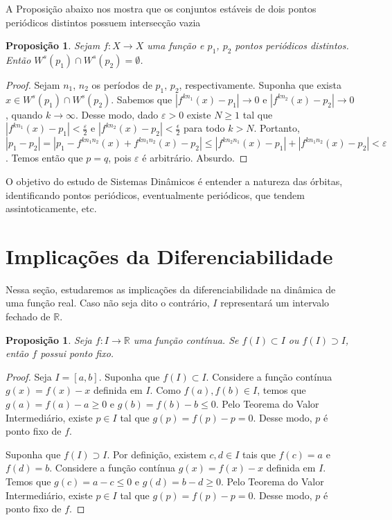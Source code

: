 \documentclass[a4paper, 12pt]{article}
\theoremstyle{definition}
\theoremstyle{plain}
\newtheorem{proposition}[definition]{Proposição}
\theoremstyle{plain}
\theoremstyle{plain}
\theoremstyle{remark}
\newcommand{\RR}{\mathbb{R}}
\begin{document}
A Proposição abaixo nos mostra que os conjuntos estáveis de dois pontos periódicos distintos possuem intersecção vazia
\begin{proposition}
Sejam $f: X \rightarrow X$ uma função e $p_1$, $p_2$ pontos periódicos distintos. Então $W^s(p_1) \cap W^s(p_2) = \emptyset$.
\end{proposition}

\begin{proof}
Sejam $n_1$, $n_2$ os períodos de $p_1$, $p_2$, respectivamente. Suponha que exista $x \in W^s(p_1) \cap W^s(p_2)$. Sabemos que $|f^{kn_1}(x) - p_1| \longrightarrow 0$ e $|f^{kn_2}(x) - p_2| \longrightarrow 0$, quando $k \longrightarrow \infty$. Desse modo, dado $\varepsilon > 0$ existe $N \geq 1$ tal que $|f^{kn_1}(x) - p_1| < \frac{\varepsilon}{2}$ e $|f^{kn_2}(x) - p_2| < \frac{\epsilon}{2}$ para todo $k > N$. Portanto, $|p_1 - p_2| = |p_1 - f^{kn_1n_2}(x) + f^{kn_1n_2}(x) - p_2| \leq |f^{kn_2n_1}(x) - p_1| + |f^{kn_1n_2}(x) - p_2| < \varepsilon$. Temos então que $p = q$, pois $\varepsilon$ é arbitrário. Absurdo.
\end{proof}

O objetivo do estudo de Sistemas Dinâmicos é entender a natureza das órbitas, identificando pontos periódicos, eventualmente periódicos, que tendem assintoticamente, etc.

\section{Implicações da Diferenciabilidade}

Nessa seção, estudaremos as implicações da diferenciabilidade na dinâmica de uma função real. Caso não seja dito o contrário, $I$ representará um intervalo fechado de $\RR$.  

\begin{proposition}
\label{proposition 2 1}
Seja $f: I \rightarrow \RR$ uma função contínua. Se $f(I) \subset I$ ou $f(I) \supset I$, então $f$ possui ponto fixo.
\end{proposition}

\begin{proof}
Seja $I = [a, b]$. Suponha que $f(I) \subset I$. Considere a função contínua $g(x) = f(x) - x$ definida em $I$. Como $f(a), f(b) \in I$, temos que $g(a) = f(a) - a \geq 0$ e $g(b) = f(b) - b \leq 0$. Pelo Teorema do Valor Intermediário, existe $p \in I$ tal que $g(p) = f(p) -p = 0$. Desse modo, $p$ é ponto fixo de $f$.

Suponha que $f(I) \supset I$. Por definição, existem $c, d \in I$ tais que $f(c) = a$ e$f(d) = b$. Considere a função contínua $g(x) = f(x) - x$ definida em $I$. Temos que $g(c) = a - c \leq 0$ e $g(d) = b - d \geq 0$. Pelo Teorema do Valor Intermediário, existe $p \in I$ tal que $g(p) = f(p) - p = 0$. Desse modo, $p$ é ponto fixo de $f$.
\end{proof}
\end{document}
